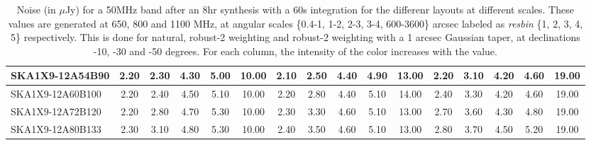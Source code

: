 \begin{table}[H]
{{\begin{tabular}{|lccccc||ccccc||ccccc|}
SKA1X9-12A54B90 & 2.20 \cellcolor{blue!18.00} & 2.30 \cellcolor{red!18.00} & 4.30 \cellcolor{green!18.00} & 5.00 \cellcolor{orange!34.80} & 10.00 \cellcolor{purple!60.00} & 2.10 \cellcolor{blue!18.00} & 2.50 \cellcolor{red!18.00} & 4.40 \cellcolor{green!32.00} & 4.90 \cellcolor{orange!39.00} & 13.00 \cellcolor{purple!18.00} & 2.20 \cellcolor{blue!18.00} & 3.10 \cellcolor{red!18.00} & 4.20 \cellcolor{green!34.80} & 4.60 \cellcolor{orange!32.00} & 19.00 \cellcolor{purple!60.00}\\ \hline 
SKA1X9-12A60B100 & 2.20 \cellcolor{blue!18.00} & 2.40 \cellcolor{red!21.82} & 4.50 \cellcolor{green!34.80} & 5.10 \cellcolor{orange!43.20} & 10.00 \cellcolor{purple!60.00} & 2.20 \cellcolor{blue!24.00} & 2.80 \cellcolor{red!30.60} & 4.40 \cellcolor{green!32.00} & 5.10 \cellcolor{orange!60.00} & 14.00 \cellcolor{purple!60.00} & 2.40 \cellcolor{blue!32.00} & 3.30 \cellcolor{red!32.00} & 4.20 \cellcolor{green!34.80} & 4.60 \cellcolor{orange!32.00} & 19.00 \cellcolor{purple!60.00}\\ \hline 
SKA1X9-12A72B120 & 2.20 \cellcolor{blue!18.00} & 2.80 \cellcolor{red!37.09} & 4.70 \cellcolor{green!51.60} & 5.30 \cellcolor{orange!60.00} & 10.00 \cellcolor{purple!60.00} & 2.30 \cellcolor{blue!30.00} & 3.30 \cellcolor{red!51.60} & 4.60 \cellcolor{green!60.00} & 5.10 \cellcolor{orange!60.00} & 13.00 \cellcolor{purple!18.00} & 2.70 \cellcolor{blue!53.00} & 3.60 \cellcolor{red!53.00} & 4.30 \cellcolor{green!43.20} & 4.80 \cellcolor{orange!41.33} & 19.00 \cellcolor{purple!60.00}\\ \hline 
SKA1X9-12A80B133 & 2.30 \cellcolor{blue!26.40} & 3.10 \cellcolor{red!48.55} & 4.80 \cellcolor{green!60.00} & 5.30 \cellcolor{orange!60.00} & 10.00 \cellcolor{purple!60.00} & 2.40 \cellcolor{blue!36.00} & 3.50 \cellcolor{red!60.00} & 4.60 \cellcolor{green!60.00} & 5.10 \cellcolor{orange!60.00} & 13.00 \cellcolor{purple!18.00} & 2.80 \cellcolor{blue!60.00} & 3.70 \cellcolor{red!60.00} & 4.50 \cellcolor{green!60.00} & 5.20 \cellcolor{orange!60.00} & 19.00 \cellcolor{purple!60.00}\\ \hline 
\end{tabular}}
\vspace{-0.300000cm}
\hspace{1cm} 

\vspace{.25cm}
\caption{Noise (in $\mu$Jy) for a 50MHz band after an 8hr synthesis with a 60s integration for the differenr layouts at different scales. These values are generated at 650, 800 and 1100 MHz, at angular scales \{0.4-1, 1-2, 2-3, 3-4, 600-3600\} arcsec labeled as {\it resbin} \{1, 2, 3, 4, 5\} respectively. This is done for natural, robust-2 weighting and robust-2 weighting with a 1 arcsec Gaussian taper, at declinations -10, -30 and -50 degrees. For each column, the intensity of the color increases with the value.}\label{tab:noise50}}
 \end{table}
